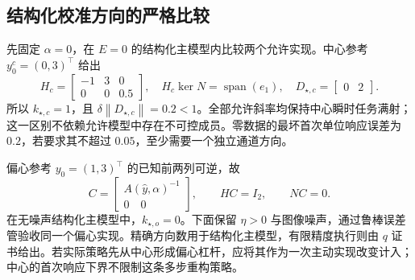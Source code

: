\documentclass[11pt,a4paper]{article}
\numberwithin{equation}{section}
\theoremstyle{definition}
\newcommand{\norm}[1]{\left\lVert#1\right\rVert}
\begin{document}
\subsection{结构化校准方向的严格比较}
先固定 $\alpha=0$，在 $E=0$ 的结构化主模型内比较两个允许实现。中心参考 $y_0^c=(0,3)^\top$ 给出
\begin{equation}
 H_c=\begin{bmatrix}-1&3&0\\0&0&0.5\end{bmatrix},
 \quad H_c\ker N=\operatorname{span}(e_1),
 \quad D_{\star,c}=\begin{bmatrix}0&2\end{bmatrix}.
 \label{rev:example-centred-rank}
\end{equation}
所以 $k_{\star,c}=1$，且 $\delta\norm{D_{\star,c}}=0.2<1$。全部允许斜率均保持中心瞬时任务满射；这一区别不依赖允许模型中存在不可控成员。零数据的最坏首次单位响应误差为 $0.2$，若要求其不超过 $0.05$，至少需要一个独立通道方向。

偏心参考 $y_0=(1,3)^\top$ 的已知前两列可逆，故
\begin{equation}
 C=\begin{bmatrix}A(\widehat y,\alpha)^{-1}\\0\quad0\end{bmatrix},
 \qquad HC=I_2,
 \qquad NC=0.
 \label{rev:example-allocation}
\end{equation}
在无噪声结构化主模型中，$k_{\star,o}=0$。下面保留 $\eta>0$ 与图像噪声，通过鲁棒误差管验收同一个偏心实现。精确方向数用于结构化主模型，有限精度执行则由 $q$ 证书给出。若实际策略先从中心形成偏心杠杆，应将其作为一次主动实现改变计入；中心的首次响应下界不限制这条多步重构策略。
\end{document}
